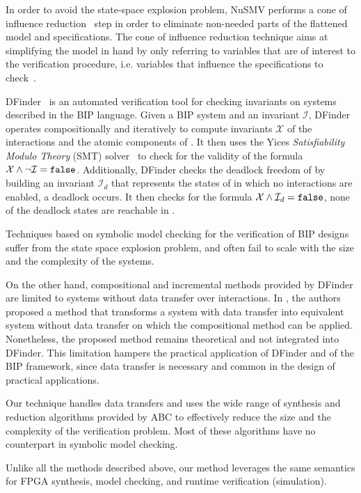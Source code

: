 In order to avoid the state-space explosion problem, NuSMV performs a cone of 
influence reduction~\cite{berezin1998compositional} step in order to eliminate
non-needed parts of the flattened model and specifications. The cone of influence
reduction technique aims at simplifying the model in hand by only 
referring to variables that are of interest to the verification procedure, i.e. variables
that influence the specifications to check~\cite{clarke1999model}.

DFinder~\cite{dfinder} is an automated verification tool for checking invariants
on systems described in the BIP language. Given a BIP system \Pm and 
an invariant $\mathcal{I}$, DFinder operates  compositionally and iteratively
to compute invariants $\mathcal{X}$ of the interactions and the atomic 
components of \Pm. It then uses the Yices {\em Satisfiability Modulo
Theory} (SMT) solver~\cite{dutertre2006fast} to check for the validity 
of the formula $\mathcal{X} \land \lnot \mathcal{I} = \mathtt{false}$. 
Additionally, DFinder checks the deadlock freedom of  \Pm by building an invariant 
$\mathcal{I}_d$ that represents the states of \Pm in which no interactions 
are enabled, \ie{} a deadlock occurs. It then checks for the formula
$\mathcal{X} \land \mathcal{I}_d = \mathtt{false}$, \ie{} none of the deadlock states
are reachable in \Pm.   

Techniques based on symbolic model checking for the verification of 
BIP designs suffer from the state space explosion problem, and often 
fail to scale with the size and the complexity of the systems. 



On the other hand, compositional and incremental methods provided by DFinder are limited to systems without data
transfer over interactions. In \cite{hungthesis10}, the authors proposed a method that transforms a system with data transfer into equivalent system without data transfer on which the compositional method can be applied. Nonetheless, the proposed method remains theoretical and not integrated into DFinder. This limitation hampers the practical application of DFinder and of the BIP framework, since data transfer is necessary and common in the design of practical applications.


Our technique handles data transfers and uses the wide range of synthesis 
and reduction algorithms provided by ABC to effectively reduce the size and 
the complexity of the verification problem. Most of these algorithms have no counterpart
in symbolic model checking.  

Unlike all the methods described above, our method leverages
the same semantics for FPGA synthesis, model checking, 
and runtime verification (simulation). 
